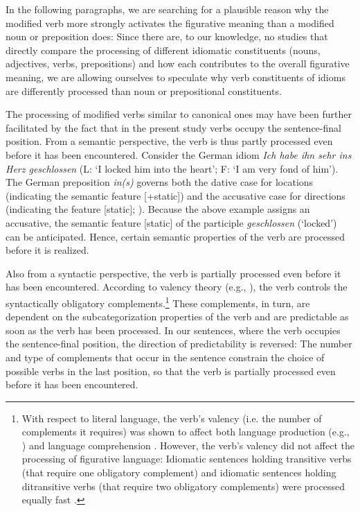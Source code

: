 \documentclass[output=paper]{langsci/langscibook}
\begin{document}
In the following paragraphs, we are searching for a plausible reason why the modified verb more strongly activates the figurative meaning than a modified noun or preposition does: Since there are, to our knowledge, no studies that directly compare the processing of different idiomatic constituents (nouns, adjectives, verbs, prepositions) and how each contributes to the overall figurative meaning, we are allowing ourselves to speculate why verb constituents of idioms are differently processed than noun or prepositional constituents. 

The processing of modified verbs similar to canonical ones may have been further facilitated by the fact that in the present study verbs occupy the sentence-final position.  From a semantic perspective, the verb is thus partly processed even before it has been encountered.  Consider the German idiom \textit{Ich habe ihn sehr ins Herz geschlossen} (L: `I locked him into the heart'; F: `I am very fond of him'). The German preposition \textit{in(s)} governs both the dative case for locations (indicating the semantic feature [+static]) and the accusative case for directions (indicating the feature [\textendash static]; \citealt{gansel:1992}). Because the above example assigns an accusative, the semantic feature [\textendash static] of the participle \textit{geschlossen} (‘locked’) can be anticipated. Hence, certain semantic properties of the verb are processed before it is realized.

Also from a syntactic perspective, the verb is partially processed even before it has been encountered. According to valency theory (e.g., \citealt{tesniere:1959}), the verb controls the syntactically obligatory complements.\footnote{With respect to literal language, the verb’s valency (i.e. the number of complements it requires) was shown to affect both language production (e.g., \citealt{thompson:1997}) and language comprehension \citep{shapiro:1987}. However, the verb’s valency did not affect the processing of figurative language: Idiomatic sentences holding transitive verbs (that require one obligatory complement) and idiomatic sentences holding ditransitive verbs (that require two obligatory complements) were processed equally fast \citep{dorrestars}.} These complements, in turn, are dependent on the subcategorization properties of the verb and are predictable as soon as the verb has been processed. In our sentences, where the verb occupies the sentence-final position, the direction of predictability is reversed: The number and type of complements that occur in the sentence constrain the choice of possible verbs in the last position, so that the verb is partially processed even before it has been encountered.
\end{document}
